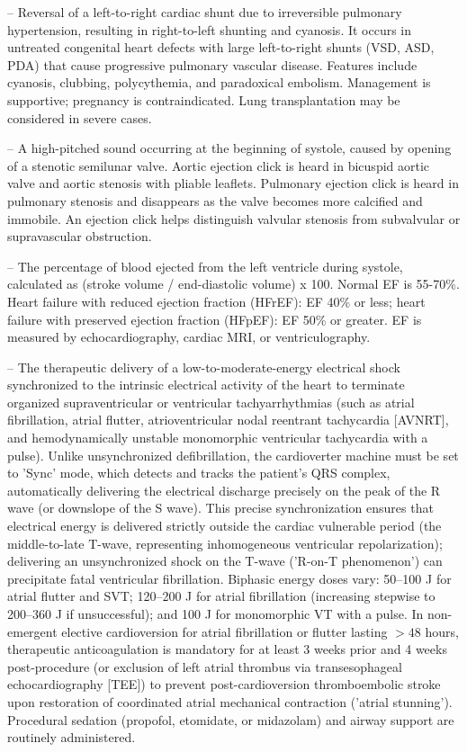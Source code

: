 -- Reversal of a left-to-right cardiac shunt due to irreversible pulmonary hypertension, resulting in right-to-left shunting and cyanosis. It occurs in untreated congenital heart defects with large left-to-right shunts (VSD, ASD, PDA) that cause progressive pulmonary vascular disease. Features include cyanosis, clubbing, polycythemia, and paradoxical embolism. Management is supportive; pregnancy is contraindicated. Lung transplantation may be considered in severe cases.

-- A high-pitched sound occurring at the beginning of systole, caused by opening of a stenotic semilunar valve. Aortic ejection click is heard in bicuspid aortic valve and aortic stenosis with pliable leaflets. Pulmonary ejection click is heard in pulmonary stenosis and disappears as the valve becomes more calcified and immobile. An ejection click helps distinguish valvular stenosis from subvalvular or supravascular obstruction.

-- The percentage of blood ejected from the left ventricle during systole, calculated as (stroke volume / end-diastolic volume) x 100. Normal EF is 55-70\%. Heart failure with reduced ejection fraction (HFrEF): EF 40\% or less; heart failure with preserved ejection fraction (HFpEF): EF 50\% or greater. EF is measured by echocardiography, cardiac MRI, or ventriculography.

-- The therapeutic delivery of a low-to-moderate-energy electrical shock synchronized to the intrinsic electrical activity of the heart to terminate organized supraventricular or ventricular tachyarrhythmias (such as atrial fibrillation, atrial flutter, atrioventricular nodal reentrant tachycardia [AVNRT], and hemodynamically unstable monomorphic ventricular tachycardia with a pulse). Unlike unsynchronized defibrillation, the cardioverter machine must be set to 'Sync' mode, which detects and tracks the patient's QRS complex, automatically delivering the electrical discharge precisely on the peak of the R wave (or downslope of the S wave). This precise synchronization ensures that electrical energy is delivered strictly outside the cardiac vulnerable period (the middle-to-late T-wave, representing inhomogeneous ventricular repolarization); delivering an unsynchronized shock on the T-wave ('R-on-T phenomenon') can precipitate fatal ventricular fibrillation. Biphasic energy doses vary: 50--100 J for atrial flutter and SVT; 120--200 J for atrial fibrillation (increasing stepwise to 200--360 J if unsuccessful); and 100 J for monomorphic VT with a pulse. In non-emergent elective cardioversion for atrial fibrillation or flutter lasting $>48$ hours, therapeutic anticoagulation is mandatory for at least 3 weeks prior and 4 weeks post-procedure (or exclusion of left atrial thrombus via transesophageal echocardiography [TEE]) to prevent post-cardioversion thromboembolic stroke upon restoration of coordinated atrial mechanical contraction ('atrial stunning'). Procedural sedation (propofol, etomidate, or midazolam) and airway support are routinely administered.

